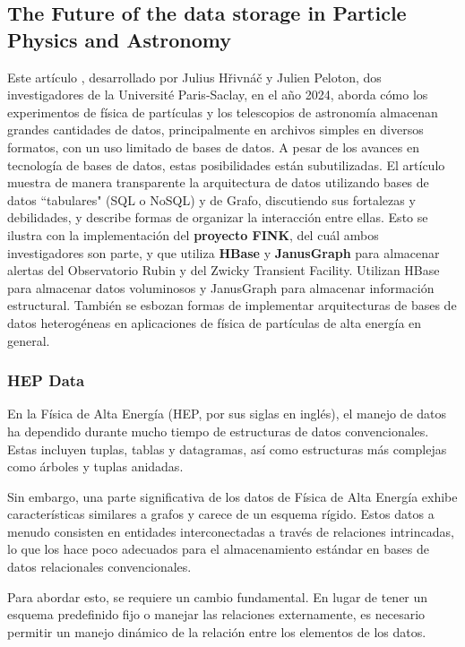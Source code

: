\documentclass[pdflatex,sn-mathphys-num]{sn-jnl}
\theoremstyle{thmstyleone}%
\theoremstyle{thmstyletwo}%
\theoremstyle{thmstylethree}%
\begin{document}
           
\subsection{The Future of the data storage in Particle Physics and Astronomy}\label{sec62}

Este artículo \cite{multidb}, desarrollado por Julius Hřivnáč y Julien Peloton, dos investigadores de la Université Paris-Saclay, en el año 2024, aborda cómo los experimentos de física de partículas y los telescopios de astronomía almacenan grandes cantidades de datos, principalmente en archivos simples en diversos formatos, con un uso limitado de bases de datos. A pesar de los avances en tecnología de bases de datos, estas posibilidades están subutilizadas. El artículo muestra de manera transparente la arquitectura de datos utilizando bases de datos ``tabulares" (SQL o NoSQL) y de Grafo, discutiendo sus fortalezas y debilidades, y describe formas de organizar la interacción entre ellas. Esto se ilustra con la implementación del \textbf{proyecto FINK}, del cuál ambos investigadores son parte, y que utiliza \textbf{HBase} y \textbf{JanusGraph} para almacenar alertas del Observatorio Rubin y del Zwicky Transient Facility. Utilizan HBase para almacenar datos voluminosos y JanusGraph para almacenar información estructural. También se esbozan formas de implementar arquitecturas de bases de datos heterogéneas en aplicaciones de física de partículas de alta energía en general.

\subsubsection{HEP Data}

En la Física de Alta Energía (HEP, por sus siglas en inglés), el manejo de datos ha dependido durante mucho tiempo de estructuras de datos convencionales. Estas incluyen tuplas, tablas y datagramas, así como estructuras más complejas como árboles y tuplas anidadas.

Sin embargo, una parte significativa de los datos de Física de Alta Energía exhibe características similares a grafos y carece de un esquema rígido. Estos datos a menudo consisten en entidades interconectadas a través de relaciones intrincadas, lo que los hace poco adecuados para el almacenamiento estándar en bases de datos relacionales convencionales.

Para abordar esto, se requiere un cambio fundamental. En lugar de tener un esquema predefinido fijo o manejar las relaciones externamente, es necesario permitir un manejo dinámico de la relación entre los elementos de los datos.
\end{document}

